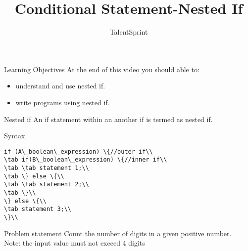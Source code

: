 \documentclass[aspectratio=169,14pt,usenames,dvipsnames]{beamer}
\title[Conditional Statement-Nested If ]{Conditional Statement-Nested If}
\newcommand\tab[1][1cm]{\hspace*{#1}}
\begin{document}
{\1
\begin{frame} \vspace{35pt}

\subtitle{TalentSprint}
\maketitle
\end{frame}
}


\begin{frame}{Learning Objectives}
At the end of this video you should able to:
\begin{itemize}
\item understand and use nested if.
\item write programs using nested if.
\end{itemize}
\end{frame}


\begin{frame}{Nested if}
An if statement within an another if is
termed as nested if.
\end{frame}



\begin{frame}{Syntax}
\begin{lstlisting}
if (A\_boolean\_expression) \{//outer if\\
\tab if(B\_boolean\_expression) \{//inner if\\
\tab \tab statement 1;\\
\tab \} else \{\\
\tab \tab statement 2;\\
\tab \}\\
\} else \{\\
\tab statement 3;\\
\}\\
\end{lstlisting}
\end{frame}

\begin{frame}{Problem statement}
Count the number of digits in a given positive
number.\\
Note: the input value must not exceed 4 digits
\end{frame}

    
\end{document}
